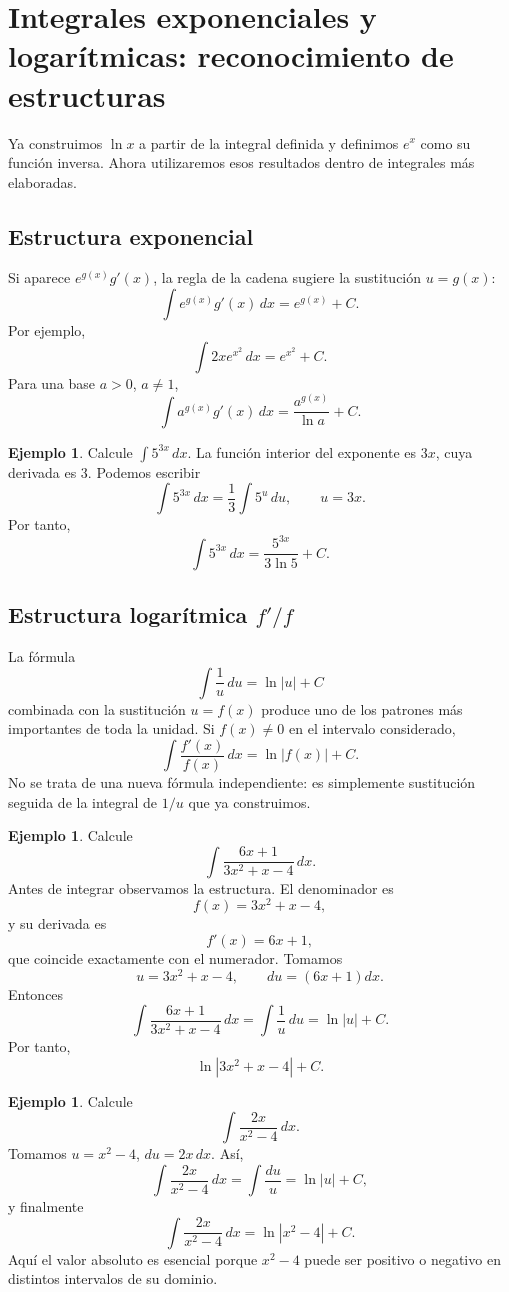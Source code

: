 \documentclass[12pt]{article}
\theoremstyle{definition}
\newtheorem{ejemplo}[teorema]{Ejemplo}
\theoremstyle{remark}
\begin{document}
\section{Integrales exponenciales y logarítmicas: reconocimiento de estructuras}
Ya construimos $\ln x$ a partir de la integral definida y definimos $e^x$ como su función inversa. Ahora utilizaremos esos resultados dentro de integrales más elaboradas.

\subsection*{Estructura exponencial}
Si aparece $e^{g(x)}g'(x)$, la regla de la cadena sugiere la sustitución $u=g(x)$:
\[
\boxed{\int e^{g(x)}g'(x)\,dx=e^{g(x)}+C.}
\]
Por ejemplo,
\[
\int 2x e^{x^2}\,dx=e^{x^2}+C.
\]
Para una base $a>0$, $a\neq1$,
\[
\boxed{\int a^{g(x)}g'(x)\,dx=\frac{a^{g(x)}}{\ln a}+C.}
\]

\begin{ejemplo}
Calcule $\int5^{3x}\,dx$.
La función interior del exponente es $3x$, cuya derivada es $3$. Podemos escribir
\[
\int5^{3x}\,dx=\frac13\int 5^u\,du,
\qquad u=3x.
\]
Por tanto,
\[
\boxed{\int5^{3x}\,dx=\frac{5^{3x}}{3\ln5}+C.}
\]
\end{ejemplo}

\subsection*{Estructura logarítmica $f'/f$}
La fórmula
\[
\int\frac1u\,du=\ln|u|+C
\]
combinada con la sustitución $u=f(x)$ produce uno de los patrones más importantes de toda la unidad. Si $f(x)\neq0$ en el intervalo considerado,
\[
\boxed{\int\frac{f'(x)}{f(x)}\,dx=\ln|f(x)|+C.}
\]
No se trata de una nueva fórmula independiente: es simplemente sustitución seguida de la integral de $1/u$ que ya construimos.

\begin{ejemplo}
Calcule
\[
\int\frac{6x+1}{3x^2+x-4}\,dx.
\]
Antes de integrar observamos la estructura. El denominador es
\[
f(x)=3x^2+x-4,
\]
y su derivada es
\[
f'(x)=6x+1,
\]
que coincide exactamente con el numerador. Tomamos
\[
u=3x^2+x-4,\qquad du=(6x+1)dx.
\]
Entonces
\[
\int\frac{6x+1}{3x^2+x-4}\,dx
=\int\frac1u\,du
=\ln|u|+C.
\]
Por tanto,
\[
\boxed{\ln|3x^2+x-4|+C}.
\]
\end{ejemplo}

\begin{ejemplo}
Calcule
\[
\int\frac{2x}{x^2-4}\,dx.
\]
Tomamos $u=x^2-4$, $du=2x\,dx$. Así,
\[
\int\frac{2x}{x^2-4}\,dx=\int\frac{du}{u}=\ln|u|+C,
\]
y finalmente
\[
\boxed{\int\frac{2x}{x^2-4}\,dx=\ln|x^2-4|+C.}
\]
Aquí el valor absoluto es esencial porque $x^2-4$ puede ser positivo o negativo en distintos intervalos de su dominio.
\end{ejemplo}
\end{document}
